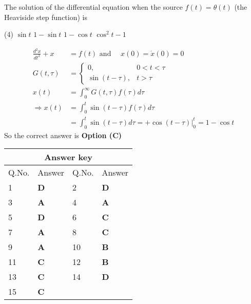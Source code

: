 \begin{enumerate}[label=\color{ocre}\textbf{\arabic*.}]
	The solution of the differential equation when the source $f(t)=\theta(t)$ (the Heaviside step function) is
	{}
	\begin{tasks}(4)
		\task[\textbf{A.}] $\sin t$
		\task[\textbf{B.}] $1-\sin t$
		\task[\textbf{C.}] $1-\cos t$
		\task[\textbf{D.}] $\cos ^{2} t-1$
	\end{tasks}\begin{answer}
		\begin{align*}
		\frac{d^{2} x}{d t^{2}}+x&=f(t)\text{ and }\quad x(0)=\dot{x}(0)=0\\
		G(t, \tau)&=\left\{\begin{array}{lr}0, & 0<t<\tau \\ \sin (t-\tau), & t>\tau\end{array}\right.\\
		x(t)&=\int_{0}^{\infty} G(t, \tau) f(\tau) d \tau\\
		\Rightarrow x(t)&=\int_{0}^{t} \sin (t-\tau) f(\tau) d \tau\\&=\int_{0}^{t} \sin (t-\tau) d \tau=+\left.\cos (t-\tau)\right|_{0} ^{t}=1-\cos t
		\end{align*}
		So the correct answer is \textbf{Option (C)}
	\end{answer}
\end{enumerate}
\setlength\arrayrulewidth{1pt}
\begin{table}[H]
	\centering
	\begin{tabular}{|p{1.5cm}|p{1.5cm}||p{1.5cm}|p{1.5cm}|}
		\hline
		\multicolumn{4}{|c|}{\textbf{Answer key}}\\\hline\hline
		\rowcolor{ocrel}Q.No.&Answer&Q.No.&Answer\\\hline
		1&\textbf{D} &2&\textbf{D}\\\hline 
		3&\textbf{A} &4&\textbf{A} \\\hline
		5&\textbf{D} &6&\textbf{C} \\\hline
		7&\textbf{A}&8&\textbf{C}\\\hline
		9&\textbf{A}&10&\textbf{B}\\\hline
		11&\textbf{C} &12&\textbf{B}\\\hline
		13&\textbf{C}&14&\textbf{D}\\\hline
		15&\textbf{C}& &\\\hline
		
	\end{tabular}
\end{table}